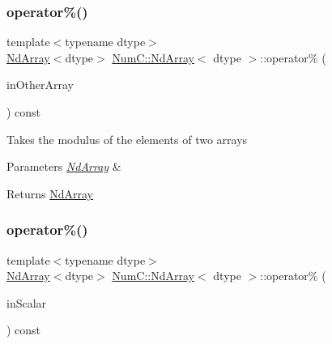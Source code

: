\subsubsection{\texorpdfstring{operator\%()}{operator\%()}\hspace{0.1cm}{\footnotesize\ttfamily [1/2]}}
{\footnotesize\ttfamily template$<$typename dtype$>$ \\
\mbox{\hyperlink{class_num_c_1_1_nd_array}{Nd\+Array}}$<$dtype$>$ \mbox{\hyperlink{class_num_c_1_1_nd_array}{Num\+C\+::\+Nd\+Array}}$<$ dtype $>$\+::operator\% (\begin{DoxyParamCaption}\item[{const \mbox{\hyperlink{class_num_c_1_1_nd_array}{Nd\+Array}}$<$ dtype $>$ \&}]{in\+Other\+Array }\end{DoxyParamCaption}) const\hspace{0.3cm}{\ttfamily [inline]}}

Takes the modulus of the elements of two arrays


\begin{DoxyParams}{Parameters}
{\em \mbox{\hyperlink{class_num_c_1_1_nd_array}{Nd\+Array}}} & \\
\hline
\end{DoxyParams}
\begin{DoxyReturn}{Returns}
\mbox{\hyperlink{class_num_c_1_1_nd_array}{Nd\+Array}} 
\end{DoxyReturn}
\mbox{\label{class_num_c_1_1_nd_array_aee3b7ea06ffb551d43f29c81de60e8fc}} 
\subsubsection{\texorpdfstring{operator\%()}{operator\%()}\hspace{0.1cm}{\footnotesize\ttfamily [2/2]}}
{\footnotesize\ttfamily template$<$typename dtype$>$ \\
\mbox{\hyperlink{class_num_c_1_1_nd_array}{Nd\+Array}}$<$dtype$>$ \mbox{\hyperlink{class_num_c_1_1_nd_array}{Num\+C\+::\+Nd\+Array}}$<$ dtype $>$\+::operator\% (\begin{DoxyParamCaption}\item[{dtype}]{in\+Scalar }\end{DoxyParamCaption}) const\hspace{0.3cm}{\ttfamily [inline]}}


